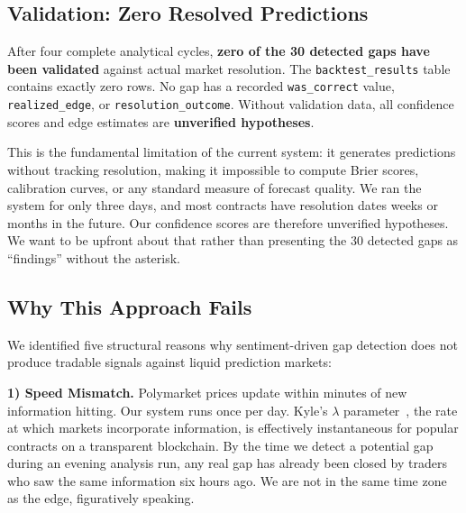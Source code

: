 \documentclass[conference]{IEEEtran}
\begin{document}
\subsection{Validation: Zero Resolved Predictions}

\begin{tcolorbox}[colback=red!5, colframe=red!60, title=Critical Finding]
After four complete analytical cycles, \textbf{zero of the 30 detected gaps have been validated} against actual market resolution. The \texttt{backtest\_results} table contains exactly zero rows. No gap has a recorded \texttt{was\_correct} value, \texttt{realized\_edge}, or \texttt{resolution\_outcome}. Without validation data, all confidence scores and edge estimates are \textbf{unverified hypotheses}.
\end{tcolorbox}

This is the fundamental limitation of the current system: it generates predictions without tracking resolution, making it impossible to compute Brier scores, calibration curves, or any standard measure of forecast quality. We ran the system for only three days, and most contracts have resolution dates weeks or months in the future. Our confidence scores are therefore unverified hypotheses. We want to be upfront about that rather than presenting the 30 detected gaps as ``findings'' without the asterisk.

\subsection{Why This Approach Fails}

We identified five structural reasons why sentiment-driven gap detection does not produce tradable signals against liquid prediction markets:

\textbf{1) Speed Mismatch.} Polymarket prices update within minutes of new information hitting. Our system runs once per day. Kyle's $\lambda$ parameter~\cite{kyle1985}, the rate at which markets incorporate information, is effectively instantaneous for popular contracts on a transparent blockchain. By the time we detect a potential gap during an evening analysis run, any real gap has already been closed by traders who saw the same information six hours ago. We are not in the same time zone as the edge, figuratively speaking.
\end{document}
